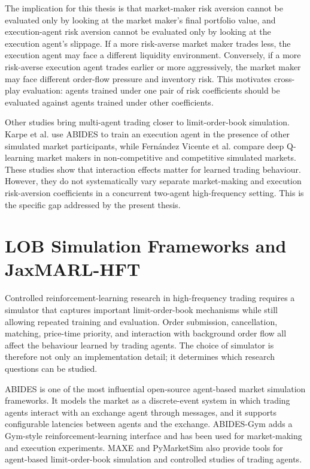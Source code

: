 \documentclass[oneside]{uva-inf-bachelor-thesis}
\begin{document}
The implication for this thesis is that market-maker risk aversion cannot be evaluated only by looking at the market maker's final portfolio value, and execution-agent risk aversion cannot be evaluated only by looking at the execution agent's slippage. If a more risk-averse market maker trades less, the execution agent may face a different liquidity environment. Conversely, if a more risk-averse execution agent trades earlier or more aggressively, the market maker may face different order-flow pressure and inventory risk. This motivates cross-play evaluation: agents trained under one pair of risk coefficients should be evaluated against agents trained under other coefficients.

Other studies bring multi-agent trading closer to limit-order-book simulation. Karpe et al. \cite{karpe_multi-agent_2020} use ABIDES to train an execution agent in the presence of other simulated market participants, while Fernández Vicente et al. \cite{vicente_deep_2021} compare deep Q-learning market makers in non-competitive and competitive simulated markets. These studies show that interaction effects matter for learned trading behaviour. However, they do not systematically vary separate market-making and execution risk-aversion coefficients in a concurrent two-agent high-frequency setting. This is the specific gap addressed by the present thesis.

\section{LOB Simulation Frameworks and JaxMARL-HFT}

Controlled reinforcement-learning research in high-frequency trading requires a simulator that captures important limit-order-book mechanisms while still allowing repeated training and evaluation. Order submission, cancellation, matching, price-time priority, and interaction with background order flow all affect the behaviour learned by trading agents. The choice of simulator is therefore not only an implementation detail; it determines which research questions can be studied.

ABIDES \cite{byrd_abides_nodate} is one of the most influential open-source agent-based market simulation frameworks. It models the market as a discrete-event system in which trading agents interact with an exchange agent through messages, and it supports configurable latencies between agents and the exchange. ABIDES-Gym \cite{amrouni_abides-gym_2021} adds a Gym-style reinforcement-learning interface and has been used for market-making and execution experiments. MAXE \cite{belcak_fast_2020} and PyMarketSim \cite{mascioli_financial_2024} also provide tools for agent-based limit-order-book simulation and controlled studies of trading agents.
\end{document}
